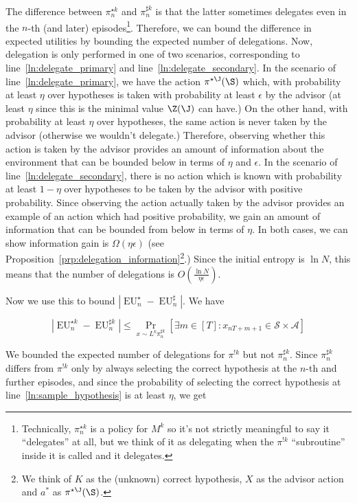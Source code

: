 \documentclass[anon,12pt]{colt2018} %
\newcommand{\AP}[1]{\left(#1\right)}
\newcommand{\AB}[1]{\left[#1\right]}
\newcommand{\Pa}[2]{\underset{#1}{\operatorname{Pr}}\AB{#2}}
\newcommand{\Abs}[1]{\left\vert #1 \right\vert}
\newcommand{\A}{\mathcal{A}}
\newcommand{\St}{\mathcal{S}}
\newcommand{\EU}{\operatorname{EU}}
\begin{document}
The difference between $\pi^{\star k}_n$ and $\pi^{\sharp k}_n$ is that the latter sometimes delegates even in the $n$-th (and later) episodes\footnote{Technically, $\pi^{\star k}_n$ is a policy for $M^k$ so it's not strictly meaningful to say it \enquote{delegates} at all, but we think of it as delegating when the $\pi^{!k}$ \enquote{subroutine} inside it is called and it delegates.}. Therefore, we can bound the difference in expected utilities by bounding the expected number of delegations. Now, delegation is only performed in one of two scenarios, corresponding to line~\ref{ln:delegate_primary} and line~\ref{ln:delegate_secondary}. In the scenario of line~\ref{ln:delegate_primary}, we have the action $\pi^{\star\J}(\S)$ which, with probability at least $\eta$ over hypotheses is taken with probability at least $\epsilon$ by the advisor (at least $\eta$ since this is the minimal value $\Z(\J)$ can have.) On the other hand, with probability at least $\eta$ over hypotheses, the same action is never taken by the advisor (otherwise we wouldn't delegate.) Therefore, observing whether this action is taken by the advisor provides an amount of information about the environment that can be bounded below in terms of $\eta$ and $\epsilon$. In the scenario of line~\ref{ln:delegate_secondary}, there is no action which is known with probability at least $1-\eta$ over hypotheses to be taken by the advisor with positive probability. Since observing the action actually taken by the advisor provides an example of an action which had positive probability, we gain an amount of information that can be bounded from below in terms of $\eta$. In both cases, we can show information gain is $\Omega(\eta\epsilon)$ (see Proposition~\ref{prp:delegation_information}\footnote{We think of $K$ as the (unknown) correct hypothesis, $X$ as the advisor action and $a^*$ as $\pi^{\star\J}(\S)$.}.) Since the initial entropy is $\ln{N}$, this means that the number of delegations is $O\AP{\frac{\ln{N}}{\eta\epsilon}}$.

Now we use this to bound $\Abs{\EU^\star_n-\EU^\sharp_n}$. We have

\begin{equation}
\Abs{\EU^{\star k}_n-\EU^{\sharp k}_n} \leq \Pa{x\sim L^k\pi^{\sharp k}_n}{\exists m \in [T]: x_{nT+m+1}\in\St \times \A}
\end{equation}

We bounded the expected number of delegations for $\pi^{!k}$ but not $\pi^{\sharp k}_n$. Since $\pi^{\sharp k}_n$ differs from $\pi^{!k}$ only by always selecting the correct hypothesis at the $n$-th and further episodes, and since the probability of selecting the correct hypothesis at line~\ref{ln:sample_hypothesis} is at least $\eta$, we get
\end{document}
